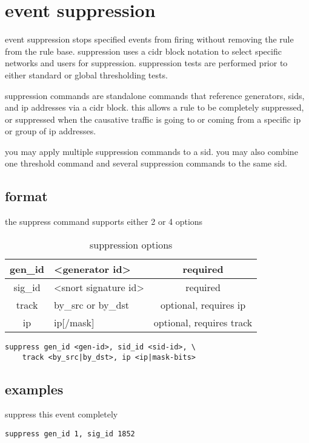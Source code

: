 \documentclass[english]{report}
\begin{document}
\newpage
\section{event suppression}
event suppression stops specified events from firing without removing the rule
from the rule base. suppression uses a cidr block notation to select specific
networks and users for suppression.  suppression tests are performed prior to
either standard or global thresholding tests.

suppression commands are standalone commands that reference generators, sids,
and ip addresses via a cidr block. this allows a rule to be completely
suppressed, or suppressed when the causative traffic is going to or coming
from a specific ip or group of ip addresses.

you may apply multiple suppression commands to a sid.  you may also combine one
threshold command and several suppression commands to the same sid.  

\subsection{format}

the suppress command supports either 2 or 4 options 

\begin{table}[!hbpt]
\caption{suppression options}
\begin{center}\begin{tabular}{|c|p{3.5in}|c|}
\hline
gen\_id & <generator id> & required\\
\hline
sig\_id & <snort signature id>  & required\\
\hline
track & by\_src or by\_dst  & optional, requires ip\\
\hline
ip & ip[/mask] & optional, requires track \\
\hline
\end{tabular}\end{center}
\end{table}

\begin{verbatim}
suppress gen_id <gen-id>, sid_id <sid-id>, \
    track <by_src|by_dst>, ip <ip|mask-bits>
\end{verbatim}

\subsection{examples}
suppress this event completely
\begin{verbatim}
suppress gen_id 1, sig_id 1852
\end{verbatim}
\end{document}
